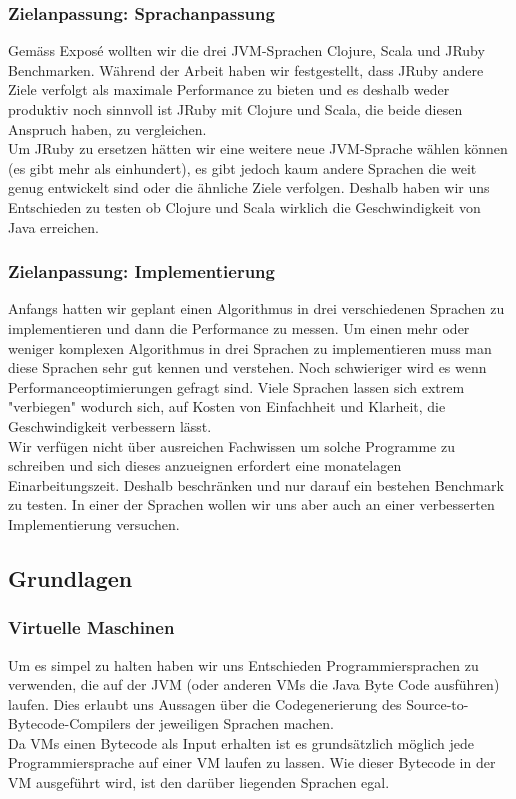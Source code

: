 \documentclass{fancydocument}
\begin{document}
\subsubsection{Zielanpassung: Sprachanpassung}

Gemäss Exposé wollten wir die drei JVM-Sprachen Clojure, Scala und JRuby
Benchmarken. W\"ahrend der Arbeit haben wir
festgestellt, dass JRuby andere Ziele verfolgt als maximale
Performance zu bieten und es deshalb weder produktiv noch sinnvoll ist
JRuby mit Clojure und Scala, die beide diesen Anspruch haben, zu
vergleichen.
\\
Um JRuby zu ersetzen h\"atten wir eine weitere neue JVM-Sprache
wählen k\"onnen (es gibt mehr als einhundert), es gibt jedoch kaum andere
Sprachen die weit genug entwickelt sind oder die \"ahnliche Ziele
verfolgen. Deshalb haben wir uns Entschieden zu testen ob
Clojure und Scala wirklich die Geschwindigkeit von Java erreichen.

\subsubsection{Zielanpassung: Implementierung}

Anfangs hatten wir geplant einen Algorithmus in drei verschiedenen Sprachen zu
implementieren und dann die Performance zu messen. Um einen mehr oder
weniger komplexen Algorithmus in drei Sprachen zu implementieren muss
man diese Sprachen sehr gut kennen und verstehen. Noch schwieriger
wird es wenn Performanceoptimierungen gefragt sind. Viele
Sprachen lassen sich extrem "verbiegen"  wodurch sich, auf Kosten von
Einfachheit und Klarheit, die Geschwindigkeit verbessern lässt.
\\
Wir verfügen nicht über ausreichen Fachwissen um solche Programme zu schreiben und sich dieses
anzueignen erfordert eine monatelagen Einarbeitungszeit. Deshalb
beschränken und nur darauf ein bestehen Benchmark zu testen. In einer
der Sprachen wollen wir uns aber auch an einer verbesserten
Implementierung versuchen.

\subsection{Grundlagen}

\subsubsection{Virtuelle Maschinen}

Um es simpel zu halten haben wir uns Entschieden
Programmiersprachen zu verwenden, die auf der JVM (oder anderen VMs die
Java Byte Code ausf\"uhren) laufen. Dies erlaubt uns Aussagen \"uber die
Codegenerierung des Source-to-Bytecode-Compilers der jeweiligen Sprachen
machen.
\\
Da VMs einen Bytecode als Input erhalten ist es grunds\"atzlich m\"oglich
jede Programmiersprache auf einer VM laufen zu lassen. Wie dieser
Bytecode in der VM ausgef\"uhrt wird, ist den dar\"uber liegenden Sprachen
egal.\\ 
\end{document}
